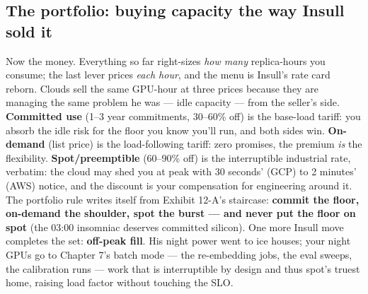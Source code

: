 \subsection*{The portfolio: buying capacity the way Insull sold it}

Now the money. Everything so far right-sizes \textit{how many} replica-hours you consume; the last lever prices \textit{each hour}, and the menu is Insull's rate card reborn. Clouds sell the same GPU-hour at three prices because they are managing the same problem he was — idle capacity — from the seller's side. \textbf{Committed use} (1–3 year commitments, 30–60\% off) is the base-load tariff: you absorb the idle risk for the floor you know you'll run, and both sides win. \textbf{On-demand} (list price) is the load-following tariff: zero promises, the premium \textit{is} the flexibility. \textbf{Spot/preemptible} (60–90\% off) is the interruptible industrial rate, verbatim: the cloud may shed you at peak with 30 seconds' (GCP) to 2 minutes' (AWS) notice, and the discount is your compensation for engineering around it. The portfolio rule writes itself from Exhibit 12-A's staircase: \textbf{commit the floor, on-demand the shoulder, spot the burst — and never put the floor on spot} (the 03:00 insomniac deserves committed silicon). One more Insull move completes the set: \textbf{off-peak fill}. His night power went to ice houses; your night GPUs go to Chapter 7's batch mode — the re-embedding jobs, the eval sweeps, the calibration runs — work that is interruptible by design and thus spot's truest home, raising load factor without touching the SLO.

